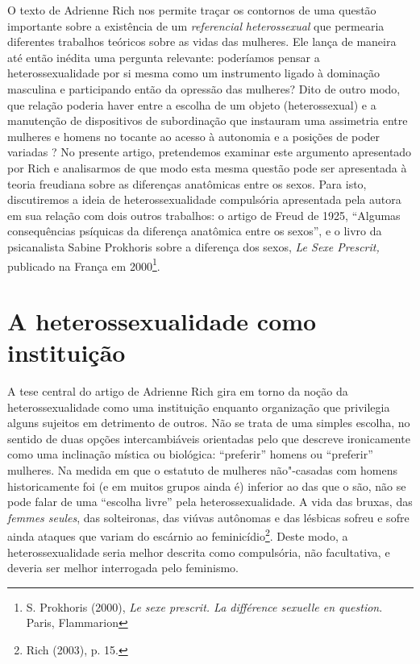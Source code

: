 O texto de Adrienne Rich nos permite traçar os contornos de uma questão
importante sobre a existência de um \emph{referencial}
\emph{heterossexual} que permearia diferentes trabalhos teóricos sobre
as vidas das mulheres. Ele lança de maneira até então inédita uma
pergunta relevante: poderíamos pensar a heterossexualidade por si mesma
como um instrumento ligado à dominação masculina e participando então da
opressão das mulheres? Dito de outro modo, que relação poderia haver
entre a escolha de um objeto (heterossexual) e a manutenção de
dispositivos de subordinação que instauram uma assimetria entre mulheres
e homens no tocante ao acesso à autonomia e a posições de poder variadas
? No presente artigo, pretendemos examinar este argumento apresentado
por Rich e analisarmos de que modo esta mesma questão pode ser
apresentada à teoria freudiana sobre as diferenças anatômicas entre os
sexos. Para isto, discutiremos a ideia de heterossexualidade compulsória
apresentada pela autora em sua relação com dois outros trabalhos: o
artigo de Freud de 1925, ``Algumas consequências psíquicas da diferença
anatômica entre os sexos'', e o livro da psicanalista Sabine Prokhoris
sobre a diferença dos sexos, \emph{Le Sexe Prescrit,} publicado na
França em 2000\footnote{S. Prokhoris (2000), \emph{Le sexe prescrit. La
  différence sexuelle en question}. Paris, Flammarion}.

\section{A heterossexualidade como instituição}

A tese central do artigo de Adrienne Rich gira em torno da noção da
heterossexualidade como uma instituição enquanto organização que
privilegia alguns sujeitos em detrimento de outros. Não se trata de uma
simples escolha, no sentido de duas opções intercambiáveis orientadas
pelo que descreve ironicamente como uma inclinação mística ou biológica:
``preferir'' homens ou ``preferir'' mulheres. Na medida em que o
estatuto de mulheres não"-casadas com homens historicamente foi (e em
muitos grupos ainda é) inferior ao das que o são, não se pode falar de
uma ``escolha livre'' pela heterossexualidade. A vida das bruxas, das
\emph{femmes seules}, das solteironas, das viúvas autônomas e das
lésbicas sofreu e sofre ainda ataques que variam do escárnio ao
feminicídio\footnote{Rich (2003), p. 15.}. Deste modo, a
heterossexualidade seria melhor descrita como compulsória, não
facultativa, e deveria ser melhor interrogada pelo feminismo.

